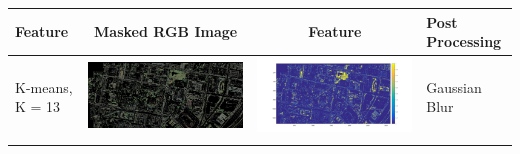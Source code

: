 \documentclass[fleqn,10pt]{SelfArx} %
\begin{document}
\begin{table}
\centering
\begin{tabular}{>{\centering\arraybackslash}M{8mm}cc>{\centering\arraybackslash}M{20mm}}
\toprule
Feature & Masked RGB Image & Feature & Post Processing \\ 
\midrule
\vspace{-3cm}
\hspace{-0.6cm}
K-means, K = 13 & \includegraphics[clip,scale=0.07]{13rgb.jpg} & \includegraphics[trim={6cm 2.5cm 4.5cm 1.6cm},clip,scale=0.18]{13.jpg} & \vspace{-3cm}Gaussian Blur \\ 
\midrule 
\vspace{-3cm}
\hspace{-0.6cm}

\end{tabular}
\end{table}
\end{document}
